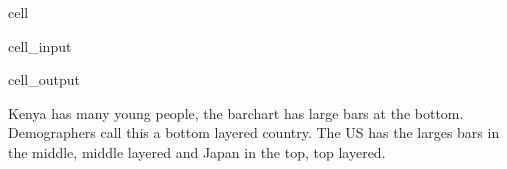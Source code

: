\documentclass[letterpaper,10pt,english]{jupyterBook}
\begin{document}
\begin{sphinxuseclass}{cell}\begin{sphinxVerbatimInput}

\begin{sphinxuseclass}{cell_input}
\begin{sphinxVerbatim}[commandchars=\\\{\}]
\end{sphinxVerbatim}

\end{sphinxuseclass}\end{sphinxVerbatimInput}
\begin{sphinxVerbatimOutput}

\begin{sphinxuseclass}{cell_output}
\noindent{}

\end{sphinxuseclass}\end{sphinxVerbatimOutput}

\end{sphinxuseclass}
\sphinxAtStartPar
Kenya has many young people, the barchart has large bars at the bottom. Demographers call this a bottom layered country. The US has the larges bars in the middle, middle layered and Japan in the top, top layered.
\end{document}
